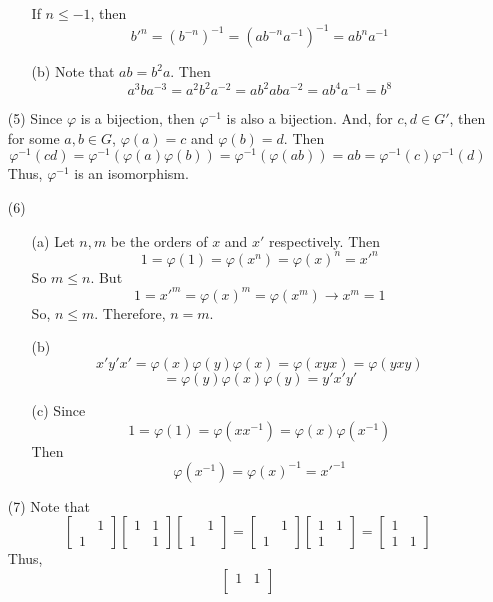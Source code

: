 \documentclass[12pt]{article}
\begin{document}
\begin{itemize}
\begin{itemize}
If $n \leq -1$, then
$$b'^n = (b^{-n})^{-1} = (ab^{-n}a^{-1})^{-1} = ab^{n}a^{-1}$$
\item[(b)]
Note that $ab = b^2a$. Then
$$a^3ba^{-3} = a^2b^2a^{-2} = ab^2aba^{-2} = ab^4a^{-1} = b^8$$
\end{itemize}
\item[(5)]
Since $\varphi$ is a bijection, then $\varphi^{-1}$ is also a bijection. And, for $c, d \in G'$, then for some $a, b \in G$, $\varphi(a) = c$ and $\varphi(b) = d$. Then 
$$\varphi^{-1}(cd) = \varphi^{-1}(\varphi(a)\varphi(b)) = \varphi^{-1}(\varphi(ab)) = ab = \varphi^{-1}(c)\varphi^{-1}(d)$$
Thus, $\varphi^{-1}$ is an isomorphism.
\item[(6)]
\begin{itemize}
\item[(a)]
Let $n, m$ be the orders of $x$ and $x'$ respectively. Then
$$1 = \varphi(1) = \varphi(x^n) = \varphi(x)^n = x'^n$$
So $m \leq n$. But
$$1 = x'^m = \varphi(x)^m = \varphi(x^m) \rightarrow x^m = 1$$
So, $n \leq m$. Therefore, $n = m$.
\item[(b)]
$$x'y'x' = \varphi(x)\varphi(y)\varphi(x) = \varphi(xyx) = \varphi(yxy)$$
$$= \varphi(y)\varphi(x)\varphi(y) = y'x'y'$$
\item[(c)]
Since
$$1 = \varphi(1) = \varphi(xx^{-1}) = \varphi(x)\varphi(x^{-1})$$
Then
$$\varphi(x^{-1}) = \varphi(x)^{-1} = x'^{-1}$$
\end{itemize}
\item[(7)]
Note that
$$\begin{bmatrix}
& 1 \\
1 &
\end{bmatrix}\begin{bmatrix}
1 & 1 \\
& 1
\end{bmatrix}\begin{bmatrix}
& 1 \\
1 &
\end{bmatrix} = \begin{bmatrix}
& 1 \\
1
\end{bmatrix}\begin{bmatrix}
1 & 1 \\
1
\end{bmatrix} = \begin{bmatrix}
1 \\
1 & 1
\end{bmatrix}$$
Thus,
$$\begin{bmatrix}
1 & 1 \\

\end{bmatrix}$$
\end{itemize}
\end{document}
